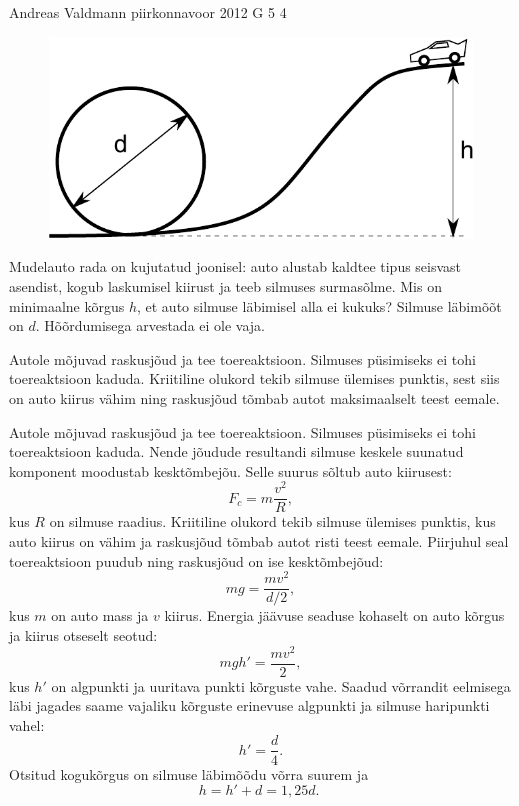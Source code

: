 {Andreas Valdmann} %
{piirkonnavoor} %
{2012} %
{G 5} %
{4} %
{
\ifStatement
\begin{figure}%
\includegraphics[width=\linewidth]{2012-v2g-05-silmus}%
\end{figure}
Mudelauto rada on kujutatud joonisel: auto alustab kaldtee tipus seisvast
asendist, kogub laskumisel kiirust ja teeb silmuses surmasõlme. Mis on
minimaalne kõrgus $h$, et auto silmuse läbimisel alla ei kukuks? Silmuse
läbimõõt on $d$. Hõõrdumisega arvestada ei ole vaja.
\fi


\ifHint
Autole mõjuvad raskusjõud ja tee toereaktsioon. Silmuses püsimiseks ei tohi toereaktsioon kaduda. Kriitiline olukord tekib silmuse ülemises punktis, sest siis on auto kiirus vähim ning raskusjõud tõmbab autot maksimaalselt teest eemale.
\fi


\ifSolution
Autole mõjuvad raskusjõud ja tee toereaktsioon. Silmuses püsimiseks ei tohi
toereaktsioon kaduda. Nende jõudude resultandi silmuse keskele
suunatud komponent moodustab kesktõmbejõu. Selle suurus sõltub auto kiirusest:
\[F_c=m\frac{v^2}{R},\]
kus $R$ on silmuse raadius.
Kriitiline olukord tekib silmuse ülemises punktis, kus auto kiirus on vähim ja
raskusjõud tõmbab autot risti teest eemale. Piirjuhul seal
toereaktsioon puudub ning raskusjõud on ise kesktõmbejõud:
\[ mg=\frac{mv^2}{d/2},\]
kus $m$ on auto mass ja $v$ kiirus.
Energia jäävuse seaduse kohaselt on auto kõrgus ja kiirus otseselt seotud:
\[ mgh'=\frac{mv^2}{2},\]
kus $h'$ on algpunkti ja uuritava punkti kõrguste vahe. Saadud võrrandit 
eelmisega läbi jagades saame vajaliku kõrguste erinevuse algpunkti ja silmuse 
haripunkti vahel:
\[ h'=\frac{d}{4}.\]
Otsitud kogukõrgus on silmuse läbimõõdu võrra suurem ja
\[ h=h'+d=1,25d.\;\]
\fi


}
